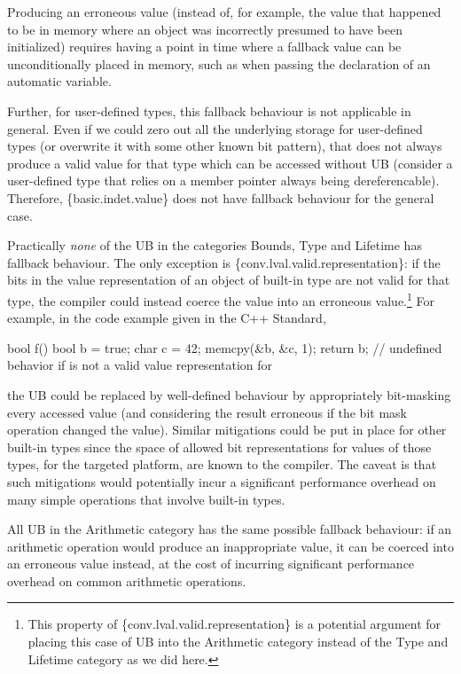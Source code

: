 Producing an erroneous value (instead of, for example, the value that happened to be in memory where an object was incorrectly presumed to have been initialized) requires having a point in time where a fallback value can be unconditionally placed in memory, such as when passing the declaration of an automatic variable.

Further, for user-defined types, this fallback behaviour is not applicable in general. Even if we could zero out all the underlying storage for user-defined types (or overwrite it with some other known bit pattern), that does not always produce a valid value for that type which can be accessed without UB (consider a user-defined type that relies on a member pointer always being dereferencable). Therefore, \{basic.indet.value\} does not have fallback behaviour for the general case.

Practically \emph{none} of the UB in the categories Bounds, Type and Lifetime has fallback behaviour. The only exception is \{conv.lval.valid.representation\}: if the bits in the value representation of an object of built-in type are not valid for that type, the compiler could instead coerce the value into an erroneous value.\footnote{This property of \{conv.lval.valid.representation\} is a potential argument for placing this case of UB into the Arithmetic category instead of the Type and Lifetime category as we did here.} For example, in the code example given in the C++ Standard,

\begin{codeblock}
bool f() {
  bool b = true;
  char c = 42;
  memcpy(&b, &c, 1);
  return b;         // undefined behavior if  is not a valid value representation for 
}
\end{codeblock}

the UB could be replaced by well-defined behaviour by appropriately bit-masking every accessed  value (and considering the result erroneous if the bit mask operation changed the value). Similar mitigations could be put in place for other built-in types since the space of allowed bit representations for values of those types, for the targeted platform, are known to the compiler. The caveat is that such mitigations would potentially incur a significant performance overhead on many simple operations that involve built-in types.

All UB in the Arithmetic category has the same possible fallback behaviour: if an arithmetic operation would produce an inappropriate value, it can be coerced into an erroneous value instead, at the cost of incurring significant performance overhead on common arithmetic operations.

